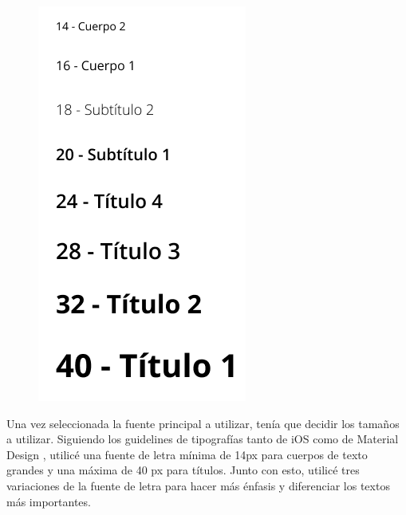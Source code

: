 \begin{figure}
    \centering
    \includegraphics[width=0.9\linewidth]{diseno/app/presentacion/tamano.png}
\end{figure}

Una vez seleccionada la fuente principal a utilizar, tenía que decidir los tamaños a utilizar. Siguiendo los guidelines de tipografías tanto de iOS \cite{typ-ios} como de Material Design \cite{typ-android}, utilicé una fuente de letra mínima de 14px para cuerpos de texto grandes y una máxima de 40 px para títulos. Junto con esto, utilicé tres variaciones de la fuente de letra para hacer más énfasis y diferenciar los textos más importantes. 

